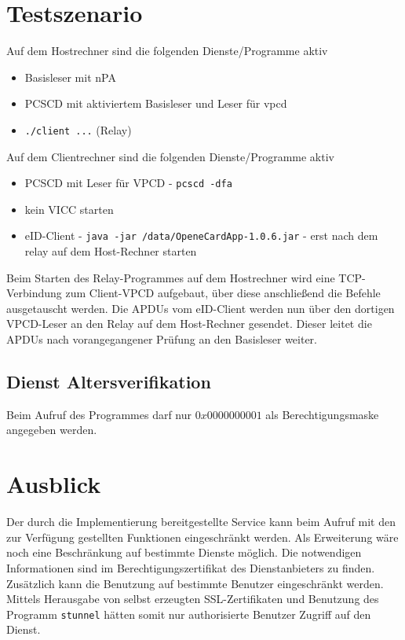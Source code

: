 \documentclass[toc=flat,fontsize=11pt,a4paper,titlepage,headsepline,numbers=noenddot, bibliography=totoc]{scrartcl}
\begin{document}
\section{Testszenario}

Auf dem Hostrechner sind die folgenden Dienste/Programme aktiv
\begin{itemize}
  \item Basisleser mit nPA
  \item PCSCD mit aktiviertem Basisleser und Leser für vpcd
  \item \verb+./client ...+ (Relay)
\end{itemize}

Auf dem Clientrechner sind die folgenden Dienste/Programme aktiv
\begin{itemize}
  \item PCSCD mit Leser für VPCD - \verb+pcscd -dfa+
  \item kein VICC starten
  \item eID-Client - \verb+java -jar /data/OpeneCardApp-1.0.6.jar+ - erst nach dem relay auf dem Host-Rechner starten  
\end{itemize}

Beim Starten des Relay-Programmes auf dem Hostrechner wird eine TCP-Verbindung zum Client-VPCD aufgebaut, über diese anschließend die Befehle 
ausgetauscht werden.
Die APDUs vom eID-Client werden nun über den dortigen VPCD-Leser an den Relay auf dem Host-Rechner gesendet. Dieser leitet die APDUs 
nach vorangegangener Prüfung an den Basisleser weiter.

\subsection{Dienst Altersverifikation}
Beim Aufruf des Programmes darf nur $0x0000000001$ als Berechtigungsmaske angegeben werden.
    

\section{Ausblick}

Der durch die Implementierung bereitgestellte Service kann beim Aufruf mit den zur Verfügung gestellten Funktionen eingeschränkt werden. 
Als Erweiterung wäre noch eine Beschränkung auf bestimmte Dienste möglich. Die notwendigen Informationen sind im Berechtigungszertifikat des 
Dienstanbieters zu finden.
Zusätzlich kann die Benutzung auf bestimmte Benutzer eingeschränkt werden. Mittels Herausgabe von selbst erzeugten SSL-Zertifikaten und 
Benutzung des Programm \verb+stunnel+ hätten somit nur authorisierte Benutzer Zugriff auf den Dienst. 
 
\end{document}
